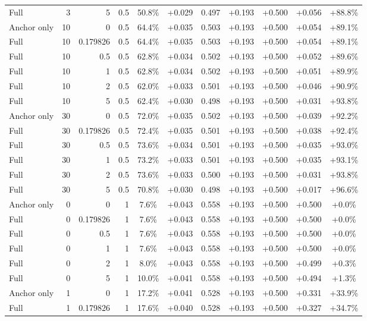 \begin{table}[htbp]
\begin{tabular}{lrrrccccccc}
Full & 3 & 5 & 0.5 & 50.8\% & +0.029 & 0.497 & +0.193 & +0.500 & +0.056 & +88.8\% \\
Anchor only & 10 & 0 & 0.5 & 64.4\% & +0.035 & 0.503 & +0.193 & +0.500 & +0.054 & +89.1\% \\
Full & 10 & 0.179826 & 0.5 & 64.4\% & +0.035 & 0.503 & +0.193 & +0.500 & +0.054 & +89.1\% \\
Full & 10 & 0.5 & 0.5 & 62.8\% & +0.034 & 0.502 & +0.193 & +0.500 & +0.052 & +89.6\% \\
Full & 10 & 1 & 0.5 & 62.8\% & +0.034 & 0.502 & +0.193 & +0.500 & +0.051 & +89.9\% \\
Full & 10 & 2 & 0.5 & 62.0\% & +0.033 & 0.501 & +0.193 & +0.500 & +0.046 & +90.9\% \\
Full & 10 & 5 & 0.5 & 62.4\% & +0.030 & 0.498 & +0.193 & +0.500 & +0.031 & +93.8\% \\
Anchor only & 30 & 0 & 0.5 & 72.0\% & +0.035 & 0.502 & +0.193 & +0.500 & +0.039 & +92.2\% \\
Full & 30 & 0.179826 & 0.5 & 72.4\% & +0.035 & 0.501 & +0.193 & +0.500 & +0.038 & +92.4\% \\
Full & 30 & 0.5 & 0.5 & 73.6\% & +0.034 & 0.501 & +0.193 & +0.500 & +0.035 & +93.0\% \\
Full & 30 & 1 & 0.5 & 73.2\% & +0.033 & 0.501 & +0.193 & +0.500 & +0.035 & +93.1\% \\
Full & 30 & 2 & 0.5 & 73.6\% & +0.033 & 0.500 & +0.193 & +0.500 & +0.031 & +93.8\% \\
Full & 30 & 5 & 0.5 & 70.8\% & +0.030 & 0.498 & +0.193 & +0.500 & +0.017 & +96.6\% \\
Anchor only & 0 & 0 & 1 & 7.6\% & +0.043 & 0.558 & +0.193 & +0.500 & +0.500 & +0.0\% \\
Full & 0 & 0.179826 & 1 & 7.6\% & +0.043 & 0.558 & +0.193 & +0.500 & +0.500 & +0.0\% \\
Full & 0 & 0.5 & 1 & 7.6\% & +0.043 & 0.558 & +0.193 & +0.500 & +0.500 & +0.0\% \\
Full & 0 & 1 & 1 & 7.6\% & +0.043 & 0.558 & +0.193 & +0.500 & +0.500 & +0.0\% \\
Full & 0 & 2 & 1 & 8.0\% & +0.043 & 0.558 & +0.193 & +0.500 & +0.499 & +0.3\% \\
Full & 0 & 5 & 1 & 10.0\% & +0.041 & 0.558 & +0.193 & +0.500 & +0.494 & +1.3\% \\
Anchor only & 1 & 0 & 1 & 17.2\% & +0.041 & 0.528 & +0.193 & +0.500 & +0.331 & +33.9\% \\
Full & 1 & 0.179826 & 1 & 17.6\% & +0.040 & 0.528 & +0.193 & +0.500 & +0.327 & +34.7\% \\

\end{tabular}
\end{table}

